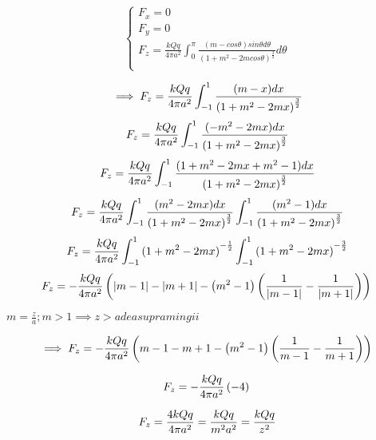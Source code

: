 \documentclass[12pt]{article}
\begin{document}
\begin{equation}
    \begin{cases}
        F_{x} = 0 \\ 
        F_{y} =  0\\ 
        F_{z} = \frac{ kQq }{ 4\pi a^{2} }\int_{0}^{\pi} \frac{ (m - cos\theta) sin\theta d \theta }{ {(1+m^{2} -2m cos\theta)}^{\frac{3}{2}} } d \theta\\

    \end{cases}
\end{equation}

\begin{equation}
    \implies F_{z} = \frac{ kQq }{ 4\pi a^{2} } \int_{-1}^{1} \frac{ (m - x) dx }{ {(1+m^{2} -2m x)}^{\frac{3}{2}} }\\
\end{equation}
\begin{equation}
    F_{z} = \frac{ kQq }{ 4\pi a^{2} } \int_{-1}^{1} \frac{ (-m^{2}-2mx) dx }{ {(1+m^{2} -2m x)}^{\frac{3}{2}} }\\
\end{equation}
\begin{equation}
    F_{z} = \frac{ kQq }{ 4\pi a^{2} } \int_{-1}^{1} \frac{ ( 1 + m^{2}-2mx+m^{2}-1 ) dx }{ {(1+m^{2} -2m x)}^{\frac{3}{2}} }\\
\end{equation}
\begin{equation}
    F_{z} = \frac{ kQq }{ 4\pi a^{2} } \int_{-1}^{1} \frac{ (m^{2}-2mx)dx }{ {(1+m^{2}-2mx)}^{\frac{3}{2}} } \int_{-1}^{1} \frac{ (m^{2} - 1)dx }{ {(1+m^{2}-2mx)}^{\frac{3}{2}}} \\
\end{equation}
\begin{equation}
    F_{z} = \frac{ kQq }{ 4\pi a^{2} } \int_{-1}^{1} {(1 + m^{2} -2mx)}^{-\frac{1}{2}} \int_{-1}^{1} {(1 + m^{2} -2mx)}^{-\frac{3}{2}} \\
\end{equation}
\begin{equation}
    F_{z} =- \frac{ kQq }{ 4\pi a^{2} } \left( \left| m - 1 \right| - \left| m + 1 \right| - \left( m^{2} - 1 \right) \left( \frac{1}{ \left| m - 1 \right| } - \frac{1}{ \left| m + 1 \right| } \right) \right)\\
\end{equation}

$ m=\frac{z}{a} ; m>1 \implies z>a deasupra mingii $

\begin{equation}
   \implies F_{z} =- \frac{ kQq }{ 4\pi a^{2} } \left(  m - 1  -  m + 1  - \left( m^{2} - 1 \right) \left( \frac{1}{  m - 1  } - \frac{1}{  m + 1  } \right) \right)\\
\end{equation}

\begin{equation}
    F_{z} =- \frac{ kQq }{ 4\pi a^{2} } \left(  -4\right) \\
\end{equation}

\begin{equation}
    F_{z} = \frac{ 4kQq }{ 4\pi a^{2} } = \frac{kQq}{m^{2}a^{2}}=\frac{kQq}{z^{2}} \\
\end{equation}
\end{document}
